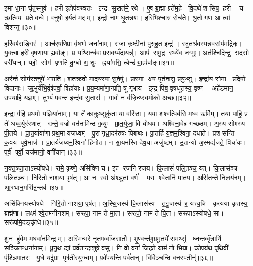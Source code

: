 इ॒मा धा॒ना घृ॑त॒स्नुव॑। हरी॑ इ॒होप॑वख्षतः। इन्द्र सु॒खत॑मे॒ रथे। ए॒ष ब्र॒ह्मा प्रते॑म॒हे। वि॒दथे॑ शसिष॒ हरी। य ऋ॒त्विय॒ प्रते॑ वन्वे। व॒नुषो॑ हर्य॒तं मदम्। इन्द्रो॒ नाम॑ घृ॒तन्नयः। हरि॑भि॒श्चारु॒ सेच॑ते। श्रु॒तो ग॒ण आ त्वा॑ विशन्तु॥३०॥

हरि॑वर्पस॒ङ्गिर॑। आच॑र्‌षणि॒प्रा वृ॑ष॒भो जना॑नाम्। राजा॑ कृष्टी॒नां पु॑रुहू॒त इन्द्र॑। स्तु॒तश्र॑व॒स्यन्नव॒सोप॑म॒द्रिक्। यु॒क्त्वा हरी॒ वृष॒णायाह्य॒र्वाङ्। प्र यथ्सिन्ध॑वः प्रस॒वय्यँदायन्न्॑। आप॑ समु॒द्र र॒थ्ये॑व जग्मुः। अत॑श्चि॒दिन्द्र॒ सद॑सो॒ वरी॑यान्। यदी॒ सोम॑ पृ॒णति॑ दु॒ग्धो अ॒शुः। ह्वया॑मसि॒ त्वेन्द्र॑ या॒ह्य॑र्वाङ्॥३१॥

अर॑न्ते॒ सोम॑स्त॒नुवे॑ भवाति। शत॑क्रतो मा॒दय॑स्वा सु॒तेषु॑। प्रास्मा अ॑व॒ पृत॑नासु॒ प्रयु॒थ्सु। इन्द्रा॑य॒ सोमा प्र॒दिवो॒ विदा॑नाः। ऋ॒भुर्येभि॒र्वृष॑पर्वा॒ विहा॑याः। प्र॒य॒म्यमा॑णा॒न्प्रति॒ षू गृ॑भाय। इन्द्र॒ पिब॒ वृष॑धूतस्य॒ वृष्ण॑। अहे॑डमान॒ उप॑याहि य॒ज्ञम्। तुभ्यं॑ पवन्त॒ इन्द॑वः सु॒तास॑। गावो॒ न व॑ज्रिन्थ्स्व॒मोको॒ अच्छ॑॥३२॥

इन्द्रा ग॑हि प्रथ॒मो य॒ज्ञिया॑नाम्। या ते॑ का॒कुथ्सुकृ॑ता॒ या वरि॑ष्ठा। यया॒ शश्व॒त्पिब॑सि॒ मध्व॑ ऊ॒र्मिम्। तया॑ पाहि॒ प्र ते॑ अध्व॒र्युर॑स्थात्। सन्ते॒ वज्रो॑ वर्ततामिन्द्र ग॒व्युः। प्रा॒त॒र्युजा॒ वि बो॑धय। अश्वि॑ना॒वेह ग॑च्छतम्। अ॒स्य सोम॑स्य पी॒तये। प्रा॒त॒र्यावा॑णा प्रथ॒मा य॑जध्वम्। पु॒रा गृध्रा॒दर॑रुषः पिबाथः। प्रा॒तर्\mbox{}हि य॒ज्ञम॒श्विना॒ दधा॑ते। प्रशसन्ति क॒वय॑ पूर्व॒भाज॑। प्रा॒तर्य॑जध्वम॒श्विना॑ हिनोत। न सा॒यम॑स्ति देव॒या अजु॑ष्टम्। उ॒तान्यो अ॒स्मद्य॑जते॒ विचा॑यः। पूर्व॑ पूर्वो॒ यज॑मानो॒ वनी॑यान्॥३३॥\anuvakamend[चा॒श्व॒जिद्यो ग॑च्छतन्नो॒ दाश॒न्नामा॑भि॒श्रीर्ग॑मेम स॒प्रथा॑ भजामहे विशन्तु या॒ह्य॑र्वाङच्छ॑ पिबाथ॒ष्षट्च॑]

न॒क्त॒ञ्जा॒ताऽस्यो॑षधे। रामे॒ कृष्णे॒ असि॑क्नि च। इ॒द र॑जनि रजय। कि॒लासं॑ पलि॒तञ्च॒ यत्। कि॒लास॑ञ्च पलि॒तञ्च॑। निरि॒तो ना॑शया॒ पृष॑त्। आ न॒ स्वो अ॑श्ञुतां॒ वर्ण॑। परा श्वे॒तानि॑ पातय। असि॑तन्ते नि॒लय॑नम्। आ॒स्थान॒मसि॑त॒न्तव॑॥३४॥

असि॑क्नियस्योषधे। निरि॒तो ना॑शया॒ पृष॑त्। अ॒स्थि॒जस्य॑ कि॒लास॑स्य। त॒नू॒जस्य॑ च॒ यत्त्व॒चि। कृ॒त्यया॑ कृ॒तस्य॒ ब्रह्म॑णा। लक्ष्म॑ श्वे॒तम॑नीनशम्। सरू॑पा॒ नाम॑ ते मा॒ता। सरू॑पो॒ नाम॑ ते पि॒ता। सरू॑पाऽस्योषधे॒ सा। सरू॑पमि॒दङ्कृ॑धि॥३५॥

शु॒न हु॑वेम म॒घवा॑न॒मिन्द्रम्। अ॒स्मिन्भरे॒ नृत॑म॒व्वाँज॑सातौ। शृ॒ण्वन्त॑मु॒ग्रमू॒तये॑ स॒मथ्सु॑। घ्नन्त॑व्वृँ॒त्राणि॑ स॒ञ्जित॒न्धना॑नाम्। धू॒नु॒थ द्यां पर्व॑तान्दा॒शुषे॒ वसु॑। नि वो॒ वना॑ जिहते॒ याम॑ नो भि॒या। को॒पय॑थ पृथि॒वीं पृ॑श्ञिमातरः। यु॒धे यदु॑ग्रा॒ पृष॑ती॒रयु॑ग्ध्वम्। प्रवे॑पयन्ति॒ पर्व॑तान्। विवि॑ञ्चन्ति॒ वन॒स्पतीन्॑॥३६॥

